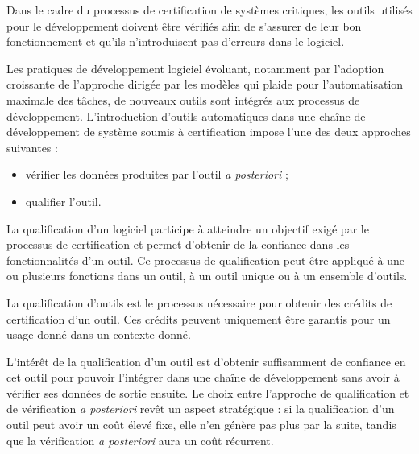 Dans le cadre du processus de certification de systèmes critiques, les outils
utilisés pour le développement doivent être vérifiés afin de s'assurer de leur
bon fonctionnement et qu'ils n'introduisent pas d'erreurs dans le logiciel.

Les pratiques de développement logiciel évoluant, notamment par l'adoption
croissante de l'approche dirigée par les modèles qui plaide pour
l'automatisation maximale des tâches, de nouveaux outils sont intégrés aux
processus de développement. L'introduction d'outils automatiques dans une
chaîne de développement de système soumis à certification impose l'une des deux
approches suivantes :
\begin{itemize}
  \item vérifier les données produites par l'outil \emph{a posteriori} ;
  \item qualifier l'outil.
\end{itemize}


La qualification d'un logiciel participe à atteindre un objectif exigé par le
processus de certification et permet d'obtenir de la confiance dans les
fonctionnalités d'un outil. Ce processus de qualification peut être appliqué à
une ou plusieurs fonctions dans un outil, à un outil unique ou à un ensemble
d'outils.

\begin{definition}[Qualification]
La qualification d'outils est le processus nécessaire pour obtenir des crédits
de certification d'un outil. Ces crédits peuvent uniquement être garantis pour
un usage donné dans un contexte donné.
\end{definition}

L'intérêt de la qualification d'un outil est d'obtenir suffisamment de
confiance en cet outil pour pouvoir l'intégrer dans une chaîne de développement
sans avoir à vérifier ses données de sortie ensuite. Le choix entre l'approche
de qualification et de vérification \emph{a posteriori} revêt un aspect
stratégique : si la qualification d'un outil peut avoir un coût élevé fixe,
elle n'en génère pas plus par la suite, tandis que la vérification \emph{a
posteriori} aura un coût récurrent.


